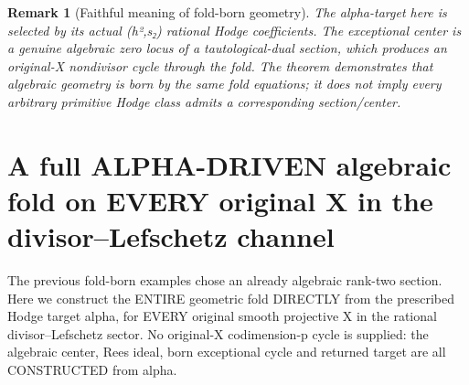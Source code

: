 \documentclass[11pt]{article}
\newtheorem{remark}[theorem]{Remark}
\begin{document}
\begin{remark}[Faithful meaning of fold-born geometry]
The alpha-target here is selected by its
actual (h²,s₂) rational Hodge coefficients.
The exceptional center is a genuine
algebraic zero locus of a tautological-dual
section, which produces an original-X
nondivisor cycle through the fold.
The theorem demonstrates that algebraic
geometry is born by the same fold
equations; it does not imply every
arbitrary primitive Hodge class
admits a corresponding section/center.
\end{remark}

\section{A full ALPHA-DRIVEN algebraic fold on EVERY original X in the divisor--Lefschetz channel}
The previous fold-born examples chose
an already algebraic rank-two section.
Here we construct the ENTIRE geometric fold
DIRECTLY from the prescribed Hodge target alpha,
for EVERY original smooth projective X in
the rational divisor--Lefschetz sector.
No original-X codimension-p cycle is supplied:
the algebraic center, Rees ideal, born
exceptional cycle and returned target
are all CONSTRUCTED from alpha.
\end{document}
